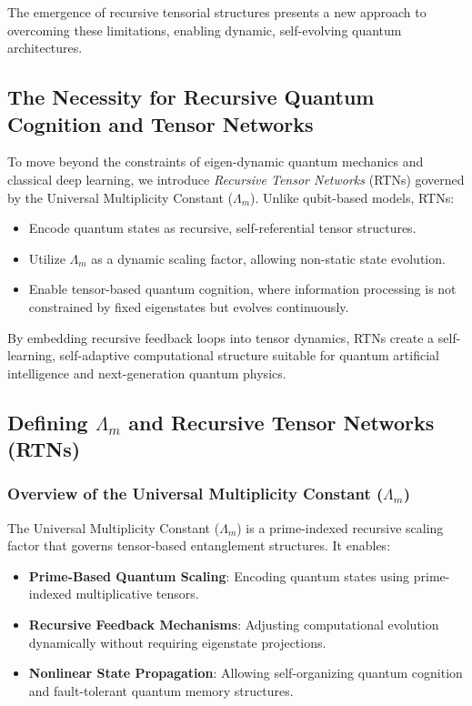 \documentclass{article}
\theoremstyle{plain}
\begin{document}
\begin{itemize}
\begin{itemize}
The emergence of recursive tensorial structures presents a new approach to overcoming these limitations, enabling dynamic, self-evolving quantum architectures.

\subsection{The Necessity for Recursive Quantum Cognition and Tensor Networks}

To move beyond the constraints of eigen-dynamic quantum mechanics and classical deep learning, we introduce \textit{Recursive Tensor Networks} (RTNs) governed by the Universal Multiplicity Constant ($\Lambda_m$). Unlike qubit-based models, RTNs:
\begin{itemize}
    \item Encode quantum states as recursive, self-referential tensor structures.
    \item Utilize $\Lambda_m$ as a dynamic scaling factor, allowing non-static state evolution.
    \item Enable tensor-based quantum cognition, where information processing is not constrained by fixed eigenstates but evolves continuously.
\end{itemize}

By embedding recursive feedback loops into tensor dynamics, RTNs create a self-learning, self-adaptive computational structure suitable for quantum artificial intelligence and next-generation quantum physics.

\subsection{Defining $\Lambda_m$ and Recursive Tensor Networks (RTNs)}

\subsubsection{Overview of the Universal Multiplicity Constant ($\Lambda_m$)}

The Universal Multiplicity Constant ($\Lambda_m$) is a prime-indexed recursive scaling factor that governs tensor-based entanglement structures. It enables:
\begin{itemize}
    \item \textbf{Prime-Based Quantum Scaling}: Encoding quantum states using prime-indexed multiplicative tensors.
    \item \textbf{Recursive Feedback Mechanisms}: Adjusting computational evolution dynamically without requiring eigenstate projections.
    \item \textbf{Nonlinear State Propagation}: Allowing self-organizing quantum cognition and fault-tolerant quantum memory structures.
\end{itemize}


\end{itemize}
\end{itemize}
\end{document}
